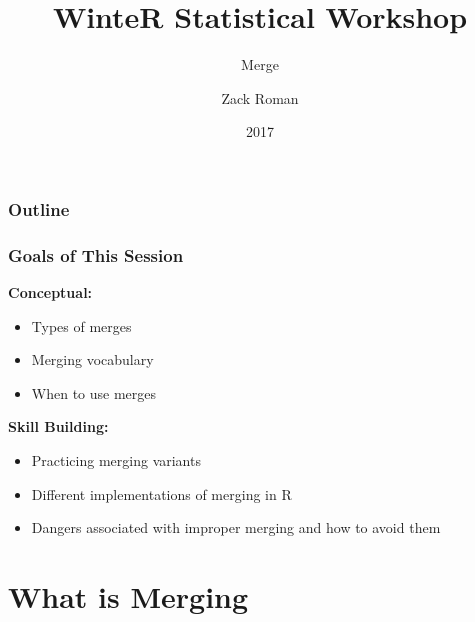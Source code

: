 \documentclass[10pt,american]{beamer}
\newcommand\makebeamertitle{\frame{\maketitle}}%
\begin{document}






\title[WinteR - merge]{WinteR Statistical Workshop}
\subtitle[]{Merge}

\author{Zack Roman}




\date{2017}

\makebeamertitle


\begin{frame}
\frametitle{Outline}

\tableofcontents{}

\end{frame}


\begin{frame}
\frametitle{Goals of This Session}

\textbf{Conceptual:}
\begin{itemize}
\item Types of merges
\item Merging vocabulary
\item When to use merges 
\end{itemize}
\textbf{Skill Building:}
\begin{itemize}
\item Practicing merging variants
\item Different implementations of merging in R
\item Dangers associated with improper merging and how to avoid them

\end{itemize}
\end{frame}



\section{What is Merging}
\end{document}

